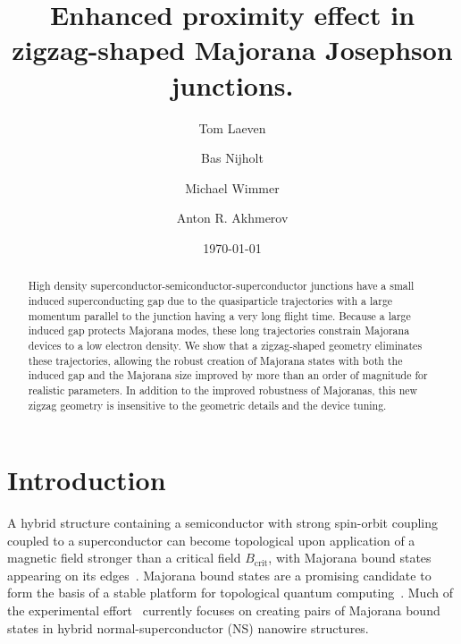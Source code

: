 \documentclass[english, twocolumn, 10pt, aps, superscriptaddress, floatfix, prb, citeautoscript]{revtex4-1}
\renewcommand{\comment}[2]{#2}
\begin{document}
\title{Enhanced proximity effect in zigzag-shaped Majorana Josephson junctions.}

\author{Tom Laeven}
\author{Bas Nijholt}
\author{Michael Wimmer}
\author{Anton R. Akhmerov}

\date{\today}
\begin{abstract}
High density superconductor-semiconductor-superconductor junctions have a small induced superconducting gap due to the quasiparticle trajectories with a large momentum parallel to the junction having a very long flight time.
Because a large induced gap protects Majorana modes, these long trajectories constrain Majorana devices to a low electron density.
We show that a zigzag-shaped geometry eliminates these trajectories, allowing the robust creation of Majorana states with both the induced gap and the Majorana size improved by more than an order of magnitude for realistic parameters.
In addition to the improved robustness of Majoranas, this new zigzag geometry is insensitive to the geometric details and the device tuning.
\end{abstract}

\maketitle

\section{Introduction}
\comment{Hybrid NS structures become topological and are useful for TQC.}
A hybrid structure containing a semiconductor with strong spin-orbit coupling coupled to a superconductor can become topological upon application of a magnetic field stronger than a critical field $B_\textrm{crit}$, with Majorana bound states appearing on its edges~\cite{Lutchyn2010,Oreg2010}.
Majorana bound states are a promising candidate to form the basis of a stable platform for topological quantum computing~\cite{Alicea2012,Beenakker2013,Beenakker2016,Leijnse2012}.
Much of the experimental effort~\cite{Mourik2012,Das2012,Deng2012,Churchill2013,Zhang2018} currently focuses on creating pairs of Majorana bound states in hybrid normal-superconductor (NS) nanowire structures.
\end{document}
